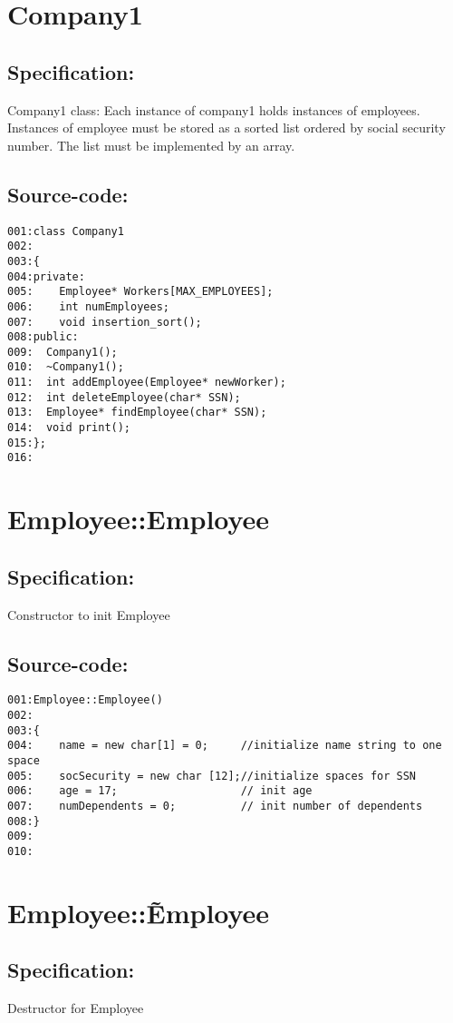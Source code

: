 \section{Company1}
\subsection*{Specification:}
Company1 class: Each instance of company1 holds instances of employees.  Instances of
employee must be stored as a sorted list ordered by social security number.  The list
must be implemented by an array.
\subsection*{Source-code:}
\begin{verbatim}
001:class Company1
002:
003:{
004:private:
005:    Employee* Workers[MAX_EMPLOYEES];
006:    int numEmployees;
007:    void insertion_sort();
008:public:
009:  Company1();
010:  ~Company1();
011:  int addEmployee(Employee* newWorker);
012:  int deleteEmployee(char* SSN);
013:  Employee* findEmployee(char* SSN);
014:  void print();
015:};
016:
\end{verbatim}
\section{Employee::Employee}
\subsection*{Specification:}
Constructor to init Employee
\subsection*{Source-code:}
\begin{verbatim}
001:Employee::Employee()
002:
003:{
004:    name = new char[1] = 0;     //initialize name string to one space
005:    socSecurity = new char [12];//initialize spaces for SSN
006:    age = 17;                   // init age
007:    numDependents = 0;          // init number of dependents
008:}
009:
010:
\end{verbatim}
\section{Employee::\~Employee}
\subsection*{Specification:}
Destructor for Employee
